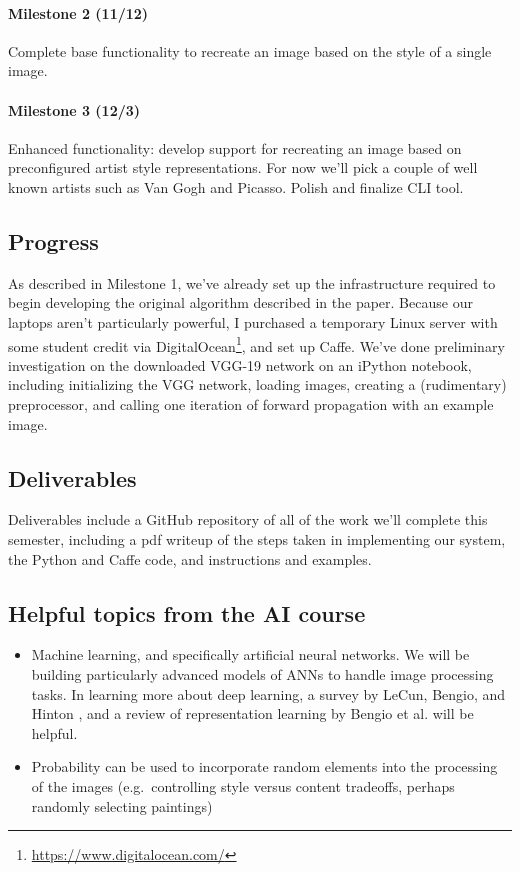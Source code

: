 \documentclass[letterpaper,10pt]{article}
\begin{document}
\paragraph{Milestone 2 (11/12)} Complete base functionality to recreate an image based
on the style of a single image.
\paragraph{Milestone 3 (12/3)} Enhanced functionality: develop support for
recreating an image based on preconfigured artist style representations. For
now we'll pick a couple of well known artists such as Van Gogh and Picasso.
Polish and finalize CLI tool.

\subsection*{Progress}
As described in Milestone 1, we've already set up the infrastructure required
to begin developing the original algorithm described in the paper. Because our
laptops aren't particularly powerful, I purchased a temporary Linux server with
some student credit via DigitalOcean\footnote{\href{https://www.digitalocean.com/}{https://www.digitalocean.com/}}, and set up Caffe. We've done preliminary
investigation on the downloaded VGG-19 network on an iPython notebook,
including initializing the VGG network, loading images, creating a
(rudimentary) preprocessor, and calling one iteration of forward propagation
with an example image.

\subsection*{Deliverables}
Deliverables include a GitHub repository of all of the work we'll complete this
semester, including a pdf writeup of the steps taken in implementing our
system, the Python and Caffe code, and instructions and examples.

\subsection*{Helpful topics from the AI course}

\begin{itemize}
    \item Machine learning, and specifically artificial neural networks. We will be
    building particularly advanced models of ANNs to handle image processing
    tasks. In learning more about deep learning, a survey by LeCun, Bengio, and
    Hinton \cite{lecun2015}, and a review of representation learning by Bengio
    et al. \cite{bengio2012} will be helpful.
    \item Probability can be used to incorporate random elements into the
      processing of the images (e.g.\ controlling style versus content
      tradeoffs, perhaps randomly selecting paintings)
\end{itemize}
\end{document}
